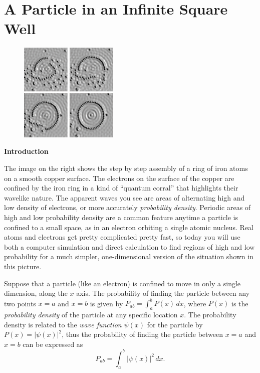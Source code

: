 \section{A Particle in an Infinite Square Well}

\makelabheader %

\bigskip

\begin{figure}
\begin{center}
\includegraphics[width=0.42\textwidth]{particle_in_infinite_well/quantum_corral.pdf}
\end{center}
\end{figure}

\textbf{Introduction}

The image on the right shows the step by step assembly of a ring of iron atoms on a smooth copper surface.  The  electrons on the surface of the copper are confined by the iron ring in a kind of ``quantum corral'' that highlights their wavelike nature. The apparent waves you see are areas of alternating high and low density of electrons, or more accurately \textit{probability density}.  Periodic areas of high and low probability density are a common feature anytime a particle is confined to a small space, as in an electron orbiting a single atomic nucleus.  Real atoms and electrons get pretty complicated pretty fast, so today you will use both a computer simulation and direct calculation to find regions of high and low probability for a much simpler, one-dimensional version of the situation shown in this picture.

Suppose that a particle (like an electron) is confined to move in only a single dimension, along the $x$ axis.  
The probability of finding the particle between any two points $x=a$ and $x=b$ is given by 
$P_{ab} = \int_a^b P(x)  \, dx$, where $P(x)$ is the \textit{probability density} of the particle at any specific location $x$.  The probability density is related to the \textit{wave function} $\psi(x)$ for the particle by 
$P(x)=\left|\psi(x)\right|^2$, thus the probability of finding the particle between $x=a$ and $x=b$ can be expressed as
$$P_{ab} = \int_a^b \left|\psi(x)\right|^2  \, dx.$$

